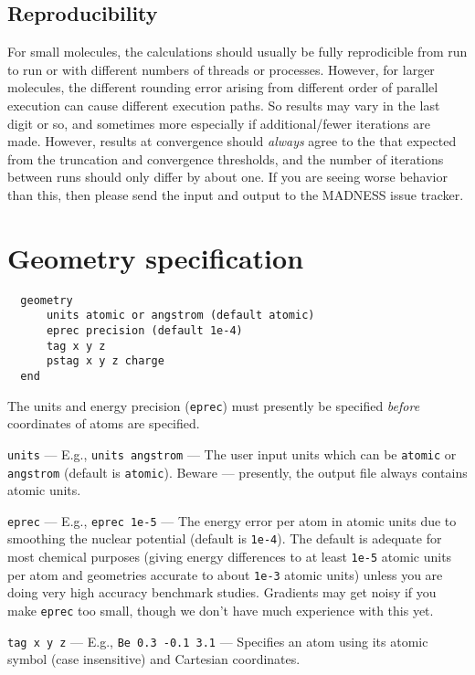 \documentclass[letterpaper]{book}
\begin{document}
\section{Reproducibility}

For small molecules, the calculations should usually be fully
reprodicible from run to run or with different numbers of threads or
processes.  However, for larger molecules, the different rounding
error arising from different order of parallel execution can cause
different execution paths.  So results may vary in the last digit or
so, and sometimes more especially if additional/fewer iterations are
made.  However, results at convergence should {\em always} agree to
the that expected from the truncation and convergence thresholds, and
the number of iterations between runs should only differ by about one.
If you are seeing worse behavior than this, then please send the input
and output to the MADNESS issue tracker.

\chapter{Geometry specification}

\begin{verbatim}
  geometry
      units atomic or angstrom (default atomic)
      eprec precision (default 1e-4)
      tag x y z
      pstag x y z charge
  end
\end{verbatim}

The units and energy precision ({\tt eprec}) must presently be specified {\em before} coordinates of atoms are specified.

{\tt units} --- E.g., {\tt units angstrom} --- The user input units which can be {\tt atomic} or {\tt angstrom} (default is {\tt atomic}).  Beware --- presently, the output file always contains atomic units.

{\tt eprec} --- E.g., {\tt eprec 1e-5} --- The energy error per atom
in atomic units due to smoothing the nuclear potential (default is
{\tt 1e-4}).  The default is adequate for most chemical purposes
(giving energy differences to at least {\tt 1e-5} atomic units per atom
and geometries accurate to about {\tt 1e-3} atomic units) unless you
are doing very high accuracy benchmark studies.  Gradients may get
noisy if you make {\tt eprec} too small, though we don't have much
experience with this yet. 

{\tt tag x y z} --- E.g., {\tt Be 0.3 -0.1 3.1} --- Specifies an atom using its atomic symbol (case insensitive) and Cartesian coordinates.
\end{document}
